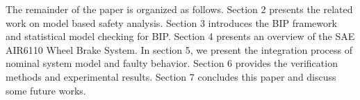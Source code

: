 The remainder of the paper is organized as follows. 
Section 2 presents the related work on model based safety analysis.
Section 3 introduces the BIP framework and statistical model checking for BIP.
Section 4 presents an overview of the SAE AIR6110 Wheel Brake System.
In section 5, we present the integration process of nominal system model and faulty behavior.
Section 6 provides the verification methods and experimental results.
Section 7 concludes this paper and discuss some future works.
